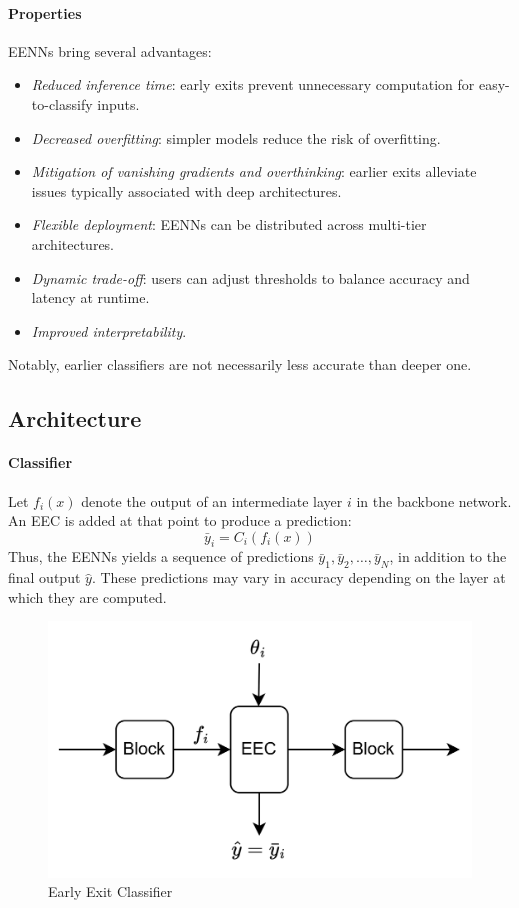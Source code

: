 \paragraph*{Properties}
EENNs bring several advantages:
\begin{itemize}
    \item \textit{Reduced inference time}: early exits prevent unnecessary computation for easy-to-classify inputs.
    \item \textit{Decreased overfitting}: simpler models reduce the risk of overfitting.
    \item \textit{Mitigation of vanishing gradients and overthinking}: earlier exits alleviate issues typically associated with deep architectures.
    \item \textit{Flexible deployment}: EENNs can be distributed across multi-tier architectures.
    \item \textit{Dynamic trade-off}: users can adjust thresholds to balance accuracy and latency at runtime.
    \item \textit{Improved interpretability}.
\end{itemize}
\noindent Notably, earlier classifiers are not necessarily less accurate than deeper one.

\subsection{Architecture}
\paragraph*{Classifier}
Let $f_i(x)$ denote the output of an intermediate layer $i$ in the backbone network.
An EEC is added at that point to produce a prediction:
\[\bar{y}_i=C_i(f_i(x))\]
Thus, the EENNs yields a sequence of predictions $\bar{y}_1,\bar{y}_2,\dots,\bar{y}_N$, in addition to the final output $\hat{y}$.
These predictions may vary in accuracy depending on the layer at which they are computed.
\begin{figure}[H]
    \centering
    \includegraphics[width=0.5\linewidth]{images/eeai11.png}
    \caption{Early Exit Classifier}
\end{figure}

